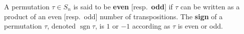 \begin{definition}
A permutation $\tau \in S_n$ is said to be \textbf{even} [resp.\ \textbf{odd}] if $\tau$ can be written as a product of an even [resp.\ odd] number of transpositions. The \textbf{sign} of a permutation $\tau$, denoted $\operatorname{sgn} \tau$, is $1$ or $-1$ according as $\tau$ is even or odd.
\end{definition}
